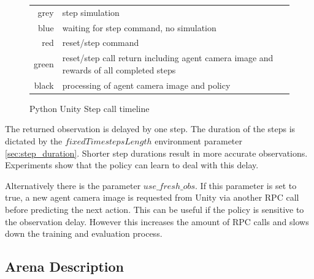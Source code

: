 \begin{figure}[h]
    \begin{tabular}{r@{: }l}
        grey & step simulation                                    \\
        blue & waiting for step command, no simulation \\
        red  & reset/step command\\
        green  & reset/step call return including agent camera image and rewards of all completed steps \\
        black & processing of agent camera image and policy \\
    \end{tabular}
    \caption{Python Unity Step call timeline}
    \label{fig:step_call_timeline}
\end{figure}


The returned observation is delayed by one step. The duration of the steps is dictated by the $fixedTimestepsLength$ environment parameter \ref{sec:step_duration}. Shorter step durations result in more accurate observations.
Experiments show that the policy can learn to deal with this delay.

Alternatively there is the parameter $use\_fresh\_obs$. If this parameter is set to true, a new agent camera image is requested from Unity via another \ac{RPC} call before predicting the next action. This can be useful if the policy is sensitive to the observation delay. However this increases the amount of \ac{RPC} calls and slows down the training and evaluation process.


\subsection{Arena Description}


